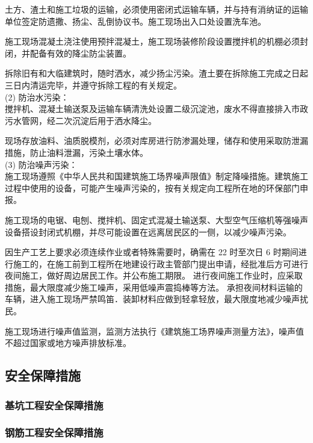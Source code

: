  土方、渣土和施工垃圾的运输，必须使用密闭式运输车辆，并与持有消纳证的运输单位签定防遗撒、扬尘、乱倒协议书。施工现场出入口处设置洗车池。  

 施工现场混凝土浇注使用预拌混凝土，施工现场装修阶段设置搅拌机的机棚必须封闭，并配备有效的降尘防尘装置。  

 拆除旧有和大临建筑时，随时洒水，减少扬尘污染。渣土要在拆除施工完成之日起三日内清运完毕，并遵守拆除工程的有关规定。  \\

(2) 防治水污染：\\

 搅拌机、混凝土输送泵及运输车辆清洗处设置二级沉淀池，废水不得直接排入市政污水管网，经二次沉淀后用于洒水降尘。  

 现场存放油料、油质脱模剂，必须对库房进行防渗漏处理，储存和使用采取防泄漏措施，防止油料泄漏，污染土壤水体。\\

(3) 防治噪声污染：\\

 施工现场遵照《中华人民共和国建筑施工场界噪声限值》制定降噪措施。建筑施工过程中使用的设备，可能产生噪声污染的，按有关规定向工程所在地的环保部门申报。  

 施工现场的电锯、电刨、搅拌机、固定式混凝土输送泵、大型空气压缩机等强噪声设备搭设封闭式机棚，并尽可能设置在远离居民区的一侧，以减少噪声污染。  

 因生产工艺上要求必须连续作业或者特殊需要时，确需在 22 时至次日 6 时期间进行施工的，在施工前到工程所在地建设行政主管部门提出申请，经批准后方可进行夜间施工，做好周边居民工作。并公布施工期限。  进行夜间施工作业时，应采取措施，最大限度减少施工噪声，采用低噪声震捣棒等方法。
承担夜间材料运输的车辆，进入施工现场严禁鸣笛．装卸材料应做到轻拿轻放，最大限度地减少噪声扰民。  

 施工现场进行噪声值监测，监测方法执行《建筑施工场界噪声测量方法》，噪声值不超过国家或地方噪声排放标准。  

\subsection{安全保障措施}
\subsubsection{基坑工程安全保障措施}

\subsubsection{钢筋工程安全保障措施}

